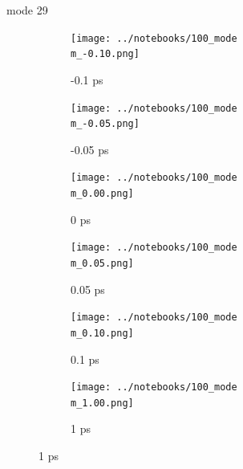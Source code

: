 \documentclass{beamer}
\newcommand\w{0.32}
\begin{document}
\renewcommand\m{29}
\begin{frame}{mode \m}
	\begin{figure}
		\centering
		\begin{subfigure}[b]{\w\textwidth}
			\centering
			\texttt{[image: ../notebooks/100\_mode\\m\_-0.10.png]}
			\caption{-0.1 ps}
		\end{subfigure}
		\begin{subfigure}[b]{\w\textwidth}
			\centering
			\texttt{[image: ../notebooks/100\_mode\\m\_-0.05.png]}
			\caption{-0.05 ps}
		\end{subfigure}
		\begin{subfigure}[b]{\w\textwidth}
			\centering
			\texttt{[image: ../notebooks/100\_mode\\m\_0.00.png]}
			\caption{0 ps}
		\end{subfigure}
		\begin{subfigure}[b]{\w\textwidth}
			\centering
			\texttt{[image: ../notebooks/100\_mode\\m\_0.05.png]}
			\caption{0.05 ps}
		\end{subfigure}
		\begin{subfigure}[b]{\w\textwidth}
			\centering
			\texttt{[image: ../notebooks/100\_mode\\m\_0.10.png]}
			\caption{0.1 ps}
		\end{subfigure}
		\begin{subfigure}[b]{\w\textwidth}
			\centering
			\texttt{[image: ../notebooks/100\_mode\\m\_1.00.png]}
			\caption{1 ps}
		\end{subfigure}
	\end{figure}
\end{frame}
\end{document}
